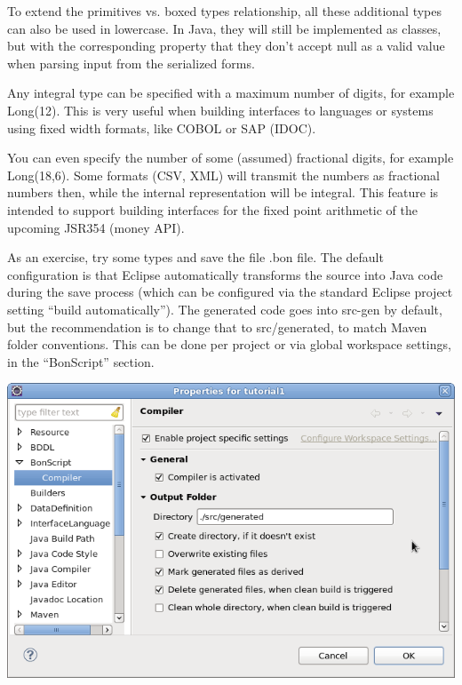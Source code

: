\documentclass[11pt,a4paper,oneside]{article}
\begin{document}
To extend the primitives vs. boxed types relationship, all these additional types can also be used in lowercase. In Java, they will still be implemented as
classes, but with the corresponding property that they don't accept null as a valid value when parsing input from the serialized forms.

\vspace{2mm}

Any integral type can be specified with a maximum number of digits, for example {\ttfamily Long(12)}. This is very useful when
building interfaces to languages or systems using fixed width formats, like COBOL or SAP (IDOC).

You can even specify the number of some (assumed) fractional digits, for example {\ttfamily Long(18,6)}. Some formats (CSV, XML)
will transmit the numbers as fractional numbers then, while the internal representation will be integral. This feature is
intended to support building interfaces for the fixed point arithmetic of the upcoming JSR354 (money API).


\vspace{2mm}

As an exercise, try some types and save the file {\ttfamily .bon} file. The default configuration is that Eclipse automatically transforms the source into
Java code during the save process (which can be configured via the standard Eclipse project setting ``build automatically''). The generated code goes into 
{\ttfamily src-gen} by default, but the recommendation is to change that to {\ttfamily src/generated}, to match Maven folder conventions.
This can be done per project or via global workspace settings, in the ``BonScript'' section.

\vspace{2mm}
\begin{center}
\includegraphics[scale=0.45]{images/tut1-003.png}
\end{center} 
 
\end{document}

